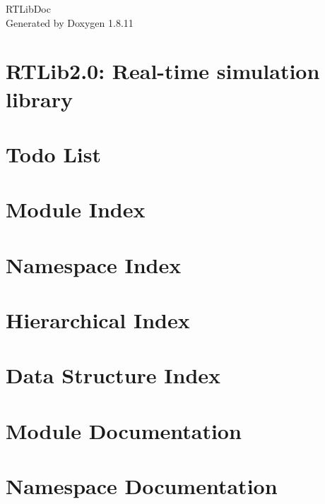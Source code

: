 \documentclass[twoside]{book}
\newcommand{\+}{\discretionary{\mbox{\scriptsize$\hookleftarrow$}}{}{}}
\newcommand{\clearemptydoublepage}{%
  \newpage{\pagestyle{empty}\cleardoublepage}%
}
\begin{document}
\hypersetup{pageanchor=false,
             bookmarksnumbered=true,
             pdfencoding=unicode
            }
\begin{titlepage}
\vspace*{7cm}
\begin{center}%
{\Large R\+T\+Lib\+Doc }\\
\vspace*{1cm}
{\large Generated by Doxygen 1.8.11}\\
\end{center}
\end{titlepage}
\clearemptydoublepage
\tableofcontents
\clearemptydoublepage
{}
\hypersetup{pageanchor=true}

\chapter{R\+T\+Lib2.0\+: Real-\/time simulation library}
\label{md_README}
\hypertarget{md_README}{}

\chapter{Todo List}
\label{todo}
\hypertarget{todo}{}

\chapter{Module Index}

\chapter{Namespace Index}

\chapter{Hierarchical Index}

\chapter{Data Structure Index}

\chapter{Module Documentation}

\chapter{Namespace Documentation}




\end{document}
